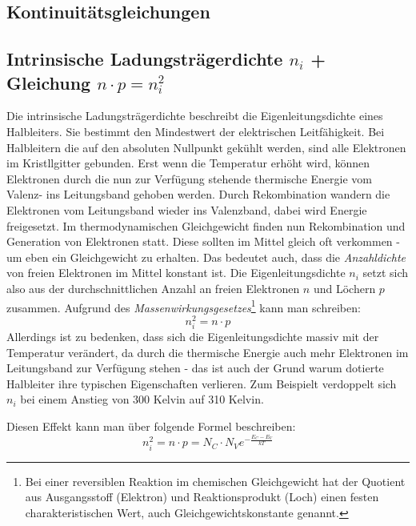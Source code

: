 \subsection{Kontinuit\"atsgleichungen }\label{k3:kontinuitaet}

	\subsection{Intrinsische Ladungsträgerdichte $n_i$ + Gleichung $n \cdot p=n_i^2$ }
	Die intrinsische Ladungsträgerdichte beschreibt die Eigenleitungsdichte eines Halbleiters. Sie bestimmt den Mindestwert der elektrischen Leitfähigkeit.  
	Bei Halbleitern die auf den absoluten Nullpunkt gekühlt werden, sind alle Elektronen im Kristllgitter gebunden. Erst wenn die Temperatur erhöht wird, können Elektronen durch die nun zur Verfügung stehende thermische Energie vom Valenz- ins Leitungsband gehoben werden.
	Durch Rekombination wandern die Elektronen vom Leitungsband wieder ins Valenzband, dabei wird Energie freigesetzt. 
	Im thermodynamischen Gleichgewicht finden nun Rekombination und Generation von Elektronen statt. Diese sollten im Mittel gleich oft verkommen - um eben ein Gleichgewicht zu erhalten.
	Das bedeutet auch, dass die \textit{Anzahldichte} von freien Elektronen im Mittel konstant ist. 
	Die Eigenleitungsdichte $n_i$ setzt sich also aus der durchschnittlichen Anzahl an freien Elektronen $n$ und Löchern $p$ zusammen. Aufgrund des \textit{Massenwirkungsgesetzes}\footnote{Bei einer reversiblen Reaktion im chemischen Gleichgewicht hat der Quotient aus Ausgangsstoff (Elektron) und Reaktionsprodukt (Loch) einen festen charakteristischen Wert, auch Gleichgewichtskonstante genannt.} kann man schreiben:
	\begin{equation}
	    n_i^2 = n \cdot p
	\end{equation}
	Allerdings ist zu bedenken, dass sich die Eigenleitungsdichte massiv mit der Temperatur verändert, da durch die thermische Energie auch mehr Elektronen im Leitungsband zur Verfügung stehen - das ist auch der Grund warum dotierte Halbleiter ihre typischen Eigenschaften verlieren.
	Zum Beispielt verdoppelt sich $n_i$ bei einem Anstieg von 300 Kelvin auf 310 Kelvin.
	
	Diesen Effekt kann man über folgende Formel beschreiben:
	\begin{equation}
	    n_i^2 = n \cdot p = N_C \cdot N_V e^{-\frac{E_C-E_V}{kT}}
	\end{equation}\label{equ:eigenleitung}
	
